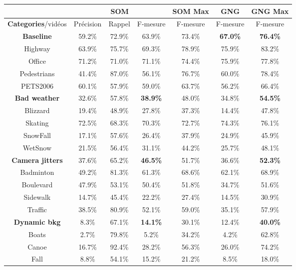 	\begin{tableth}
    \begin{tabular}{|c|c|c|c|c|c|c|}
		\hline
		& \multicolumn{3}{c|}{SOM} & SOM Max & GNG & GNG Max\\
        \hline
        \textbf{Categories}/vidéos & Précision & Rappel & F-mesure & F-mesure & F-mesure & F-mesure\\
        \hline
        \textbf{Baseline} & 59.2\% & 72.9\% & 63.9\% & 73.4\% & \textbf{67.0\%} & \textbf{76.4\%} \\
		\hline
		Highway & 63.9\% & 75.7\% & 69.3\% & 78.9\% & 75.9\% & 83.2\% \\
		Office & 71.2\% & 71.0\% & 71.1\% & 74.4\% & 75.9\% & 77.8\% \\
		Pedestrians & 41.4\% & 87.0\% & 56.1\% & 76.7\% & 60.0\% & 78.4\% \\
		PETS2006 & 60.1\% & 57.9\% & 59.0\% & 63.7\% & 56.2\% & 66.4\% \\
		\hline
        \textbf{Bad weather} & 32.6\% & 57.8\% & \textbf{38.9\%} & 48.0\% & 34.8\% & \textbf{54.5\%} \\
		\hline
		Blizzard & 19.4\% & 48.9\% & 27.8\% & 37.3\% & 14.4\% & 47.8\% \\
		Skating & 72.5\% & 68.3\% & 70.3\% & 72.7\% & 74.3\% & 76.1\% \\
		SnowFall & 17.1\% & 57.6\% & 26.4\% & 37.9\% & 24.9\% & 45.9\% \\
		WetSnow & 21.5\% & 56.4\% & 31.1\% & 44.2\% & 25.7\% & 48.1\% \\
		\hline
        \textbf{Camera jitters} & 37.6\% & 65.2\% & \textbf{46.5\%} & 51.7\% & 36.6\% & \textbf{52.3\%} \\
		\hline
		Badminton & 49.2\% & 81.3\% & 61.3\% & 68.6\% & 62.1\% & 68.9\% \\
		Boulevard & 47.9\% & 53.1\% & 50.4\% & 51.8\% & 34.7\% & 51.6\% \\
		Sidewalk & 14.7\% & 45.4\% & 22.2\% & 27.4\% & 14.5\% & 30.9\% \\
		Traffic & 38.5\% & 80.9\% & 52.1\% & 59.0\% & 35.1\% & 57.9\% \\
		\hline
        \textbf{Dynamic bkg} & 8.3\% & 67.1\% & \textbf{14.1\%} & 30.1\% & 12.4\% & \textbf{40.0\%} \\
		\hline
		Boats & 2.7\% & 79.8\% & 5.2\% & 34.2\% & 4.2\% & 62.8\% \\
		Canoe & 16.7\% & 92.4\% & 28.2\% & 56.3\% & 26.0\% & 74.2\% \\
		Fall & 8.8\% & 54.1\% & 15.2\% & 21.2\% & 8.5\% & 18.0\% \\

\end{tabular}
\end{tableth}
